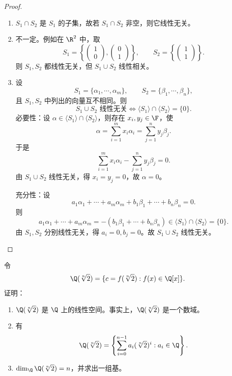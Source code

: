 \begin{proof}
	\begin{enumerate}
		\item $S_1\cap S_2$ 是 $S_1$ 的子集，故若 $S_1\cap S_2$ 非空，则它线性无关。
		\item 不一定。例如在 $\R^2$ 中，取
		\[
		S_1=\left\{
		\begin{pmatrix}1\\0\end{pmatrix},
		\begin{pmatrix}0\\1\end{pmatrix}
		\right\},
		\qquad
		S_2=\left\{
		\begin{pmatrix}1\\1\end{pmatrix}
		\right\}.
		\]
		则 $S_1,S_2$ 都线性无关，但 $S_1\cup S_2$ 线性相关。
		\item 设
		\[
		S_1=\{\alpha_1,\cdots,\alpha_m\},
		\qquad
		S_2=\{\beta_1,\cdots,\beta_n\},
		\]
		且 $S_1,S_2$ 中列出的向量互不相同。则
		\[
		S_1\cup S_2\text{ 线性无关}
		\Longleftrightarrow
		\langle S_1\rangle\cap\langle S_2\rangle=\{0\}.
		\]
		必要性：设 $\alpha\in\langle S_1\rangle\cap\langle S_2\rangle$，则存在 $x_i,y_j\in\F$，使
		\[
		\alpha=\sum_{i=1}^{m}x_i\alpha_i=\sum_{j=1}^{n}y_j\beta_j.
		\]
		于是
		\[
		\sum_{i=1}^{m}x_i\alpha_i-\sum_{j=1}^{n}y_j\beta_j=0.
		\]
		由 $S_1\cup S_2$ 线性无关，得 $x_i=y_j=0$，故 $\alpha=0$。
		
		充分性：设
		\[
		a_1\alpha_1+\cdots+a_m\alpha_m+b_1\beta_1+\cdots+b_n\beta_n=0.
		\]
		则
		\[
		a_1\alpha_1+\cdots+a_m\alpha_m
		=-(b_1\beta_1+\cdots+b_n\beta_n)
		\in \langle S_1\rangle\cap\langle S_2\rangle=\{0\}.
		\]
		由 $S_1,S_2$ 分别线性无关，得 $a_i=0,b_j=0$。故 $S_1\cup S_2$ 线性无关。
	\end{enumerate}
\end{proof}

\begin{problem}
	令
	\[
	\Q(\sqrt[n]{2})=\{c=f(\sqrt[n]{2}):f(x)\in\Q[x]\}.
	\]
	证明：
	\begin{enumerate}
		\item $\Q(\sqrt[n]{2})$ 是 $\Q$ 上的线性空间。事实上，$\Q(\sqrt[n]{2})$ 是一个数域。
		\item 有
		\[
		\Q(\sqrt[n]{2})=
		\left\{
		\sum_{i=0}^{n-1}a_i(\sqrt[n]{2})^i:a_i\in\Q
		\right\}.
		\]
		\item $\dim_{\Q}\Q(\sqrt[n]{2})=n$，并求出一组基。
	\end{enumerate}
\end{problem}

